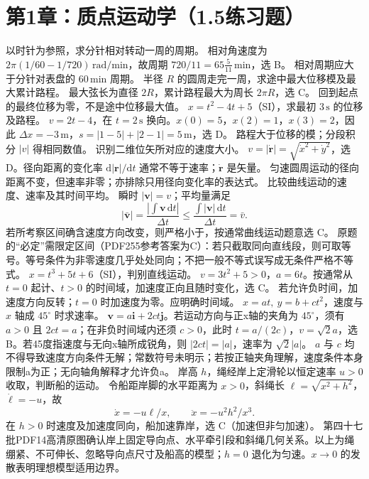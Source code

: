 \section{第1章：质点运动学（1.5练习题）}
\problemtext 以时针为参照，求分针相对转动一周的周期。
\workings 相对角速度为 $2\pi(1/60-1/720)\,\mathrm{rad/min}$，故周期 $720/11=65\tfrac5{11}\,\mathrm{min}$，选 B。
\crosscheck 相对周期应大于分针对表盘的 $60\,\mathrm{min}$ 周期。
\problemtext 半径 $R$ 的圆周走完一周，求途中最大位移模及最大累计路程。
\workings 最大弦长为直径 $2R$，累计路程最大为周长 $2\pi R$，选 C。
\crosscheck 回到起点的最终位移为零，不是途中位移最大值。
\problemtext $x=t^2-4t+5$（SI），求最初 $3\,\mathrm s$ 的位移及路程。
\workings $v=2t-4$，在 $t=2\,\mathrm s$ 换向。$x(0)=5$，$x(2)=1$，$x(3)=2$，因此 $\Delta x=-3\,\mathrm m$，$s=|1-5|+|2-1|=5\,\mathrm m$，选 D。
\crosscheck 路程大于位移的模；分段积分 $|v|$ 得相同数值。
\problemtext 识别二维位矢所对应的速度大小。
\workings $v=|\dot{\bm r}|=\sqrt{\dot x^2+\dot y^2}$，选 D。径向距离的变化率 $\mathrm d|\bm r|/\mathrm dt$ 通常不等于速率；$\dot{\bm r}$ 是矢量。
\crosscheck 匀速圆周运动的径向距离不变，但速率非零；亦排除只用径向变化率的表达式。
\problemtext 比较曲线运动的速度、速率及其时间平均。
\workings 瞬时 $|\bm v|=v$；平均量满足
\[
|\bar{\bm v}|=\frac{|\int\bm v\,\mathrm dt|}{\Delta t}
\le\frac{\int|\bm v|\,\mathrm dt}{\Delta t}=\bar v.
\]
若所考察区间确含速度方向改变，则严格小于，按通常曲线运动题意选 C。
\crosscheck 原题的“必定”需限定区间（PDF255参考答案为C）：若只截取同向直线段，则可取等号。等号条件为非零速度几乎处处同向；不把一般不等式误写成无条件严格不等式。
\problemtext $x=t^3+5t+6$（SI），判别直线运动。
\workings $v=3t^2+5>0$，$a=6t$。按通常从 $t=0$ 起计、$t>0$ 的时间域，加速度正向且随时变化，选 C。
\crosscheck 若允许负时间，加速度方向反转；$t=0$ 时加速度为零。应明确时间域。
\problemtext $x=at,\ y=b+ct^2$，速度与 $x$ 轴成 $45^\circ$ 时求速率。
\workings $\bm v=a\bm i+2ct\bm j$。若运动方向与正x轴的夹角为 $45^\circ$，须有 $a>0$ 且 $2ct=a$；在非负时间域内还须 $c>0$，此时 $t=a/(2c)$，$v=\sqrt2a$，选B。若45度指速度与无向x轴所成锐角，则 $|2ct|=|a|$，速率为 $\sqrt2|a|$。
\crosscheck $a$ 与 $c$ 均不得导致速度方向条件无解；常数符号未明示；若按正轴夹角理解，速度条件本身限制a为正；无向轴角解释才允许负a。
\problemtext 岸高 $h$，绳经岸上定滑轮以恒定速率 $u>0$ 收取，判断船的运动。
\workings 令船距岸脚的水平距离为 $x>0$，斜绳长 $\ell=\sqrt{x^2+h^2}$，$\dot\ell=-u$，故
\[
\dot x=-u\ell/x,\qquad \ddot x=-u^2h^2/x^3.
\]
在 $h>0$ 时速度及加速度同向，船加速靠岸，选 C（加速但非匀加速）。
\crosscheck 第四十七批PDF14高清原图确认岸上固定导向点、水平牵引段和斜绳几何关系。以上为绳绷紧、不可伸长、忽略导向点尺寸及船高的模型；$h=0$ 退化为匀速。$x\to0$ 的发散表明理想模型适用边界。

